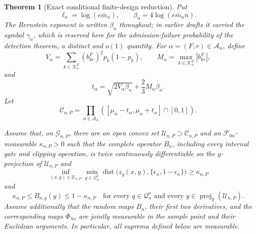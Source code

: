 \documentclass[11pt]{article}
\newtheorem{theorem}{Theorem}[section]
\theoremstyle{definition}
\newcommand{\1}{\mathbf 1}\newcommand{\op}{\operatorname}
\begin{document}
\begin{theorem}[Exact conditional finite-design reduction]
Put
\[
\ell_n=\log(e\bar m_n),
\qquad
\beta_n=4\log(e\bar m_nn).
\]
The Bernstein exponent is written $\beta_n$ throughout; in earlier drafts it
carried the symbol $\gamma_n$, which is reserved here for the
admission-failure probability of the detection theorem, a distinct and
$o(1)$ quantity.
For $\alpha=(F,r)\in\mathcal A_n$, define
\begin{equation}
V_\alpha
=
\sum_{k\in\mathcal K_n^F}
(b_{kr}^F)^2p_k(1-p_k),
\qquad
M_\alpha
=
\max_{k\in\mathcal K_n^F}|b_{kr}^F|,
\label{eq:cell-variance-envelope-final}
\end{equation}
and
\begin{equation}
t_\alpha
=
\sqrt{2V_\alpha\beta_n}
+
\frac{2}{3}M_\alpha\beta_n.
\label{eq:bernstein-radius-final}
\end{equation}
Let
\begin{equation}
\mathcal C_{n,P}
=
\prod_{\alpha\in\mathcal A_n}
\left(
[\mu_\alpha-t_\alpha,\mu_\alpha+t_\alpha]\cap[0,1]
\right).
\label{eq:bernstein-rectangle-final}
\end{equation}

Assume that, on $\mathcal G_{n,P}$, there are an open convex set
$\mathcal U_{n,P}\supset\mathcal C_{n,P}$ and an
$\mathcal F_{0n}$-measurable $\kappa_{n,P}>0$ such that the complete
operator $B_n$, including every internal gate and clipping
operation, is twice continuously differentiable on the
$y$-projection of $\mathcal U_{n,P}$ and
\begin{equation}
\inf_{(x,y)\in\mathcal U_{n,P}}
\min_{q\in\mathcal Q_n^o}
\operatorname{dist}
\bigl(z_q(x,y),\{\epsilon_n,1-\epsilon_n\}\bigr)
\ge\kappa_{n,P}
\label{eq:no-knot-condition-final}
\end{equation}
and
\begin{equation}
\kappa_{n,P}
\le
B_{n,q}(y)
\le
1-\kappa_{n,P}
\quad
\text{for every }q\in\mathcal Q_n^o
\text{ and every }y\in\operatorname{proj}_y(\mathcal U_{n,P}).
\label{eq:baseline-interior-condition-final}
\end{equation}
Assume additionally that the random maps $B_n$, their first two
derivatives, and the corresponding maps $\Phi_{\lambda n}$ are
jointly measurable in the sample point and their Euclidean
arguments. In particular, all suprema defined below are measurable.


\end{theorem}
\end{document}
